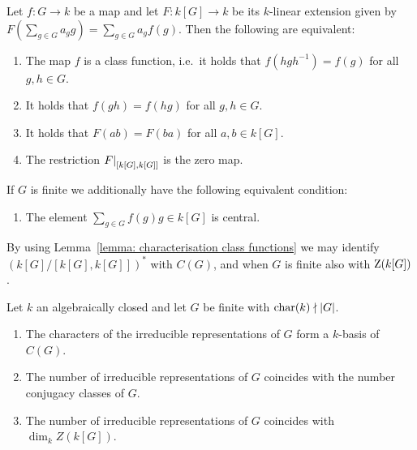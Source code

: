 \begin{lemma}
  \label{lemma: characterisation class functions}
  Let $f \colon G \to k$ be a map and let $F \colon k[G] \to k$ be its $k$-linear extension given by $F(\sum_{g \in G} a_g g) = \sum_{g \in G} a_g f(g)$.
  Then the following are equivalent:
  \begin{enumerate}
    \item \label{enum: class function}
      The map $f$ is a class function, i.e.\ it holds that $f(h g h^{-1}) = f(g)$ for all $g, h \in G$.
    \item
      It holds that $f(gh) = f(hg)$ for all $g, h \in G$.
    \item
      It holds that $F(ab) = F(ba)$ for all $a, b \in k[G]$.
    \item
      The restriction $\restrict{F}{[k[G],k[G]]}$ is the zero map.
  \end{enumerate}
  If $G$ is finite we additionally have the following equivalent condition:
  \begin{enumerate}[resume]
    \item
      \label{enum: center of group algebra}
      The element $\sum_{g \in G} f(g) g \in k[G]$ is central.
  \end{enumerate}
\end{lemma}




\begin{fluff}
  By using Lemma~\ref{lemma: characterisation class functions} we may identify $(k[G]/[k[G], k[G]])^*$ with $C(G)$, and when $G$ is finite also with $\operatorname{Z}(k[G])$.
\end{fluff}




\begin{proposition}
  \label{proposition: conjugacy classes and irreducible representations}
  Let $k$ an algebraically closed and let $G$ be finite with $\operatorname{char}(k) \nmid |G|$.
  \begin{enumerate}
    \item
      \label{enumerate: characters are basis of class functions}
     The characters of the irreducible representations of $G$ form a $k$-basis of $C(G)$.
    \item
      \label{enumerate: number of irr rep is number of conjugacy classes}
      The number of irreducible representations of $G$ coincides with the number conjugacy classes of $G$.
    \item
      \label{enumerate: number of irr rep is dim of center}
      The number of irreducible representations of $G$ coincides with $\dim_k Z(k[G])$.
  \end{enumerate}
\end{proposition}



